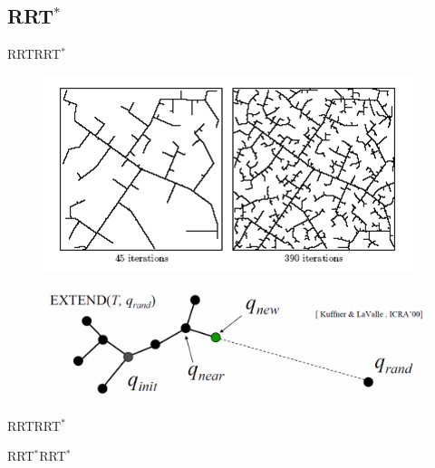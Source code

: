 \subsection{RRT$^{*}$}

\begin{frame}{RRT}{RRT$^{*}$}
	\begin{figure}
		\centering
		\includegraphics[width=.5\linewidth]{figure/RRT_graph1}
		\label{fig:rrt}
	\end{figure}
	\begin{figure}
		\centering
		\includegraphics[width=.9\linewidth]{figure/rrt_extend}
		\label{fig:rrt_extend}
	\end{figure}
\end{frame}

\begin{frame}{RRT}{RRT$^{*}$}
	
\end{frame}


\begin{frame}{RRT$^{*}$}{RRT$^{*}$}
	
\end{frame}
